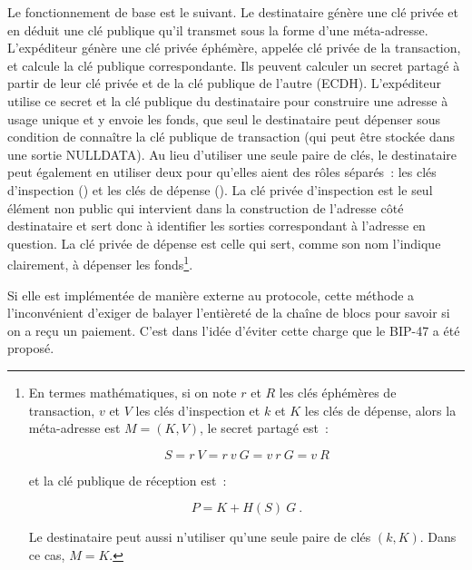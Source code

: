 Le fonctionnement de base est le suivant. Le destinataire génère une clé privée et en déduit une clé publique qu'il transmet sous la forme d'une méta-adresse. L'expéditeur génère une clé privée éphémère, appelée clé privée de la transaction, et calcule la clé publique correspondante. Ils peuvent calculer un secret partagé à partir de leur clé privée et de la clé publique de l'autre (ECDH). L'expéditeur utilise ce secret et la clé publique du destinataire pour construire une adresse à usage unique et y envoie les fonds, que seul le destinataire peut dépenser sous condition de connaître la clé publique de transaction (qui peut être stockée dans une sortie NULLDATA). Au lieu d'utiliser une seule paire de clés, le destinataire peut également en utiliser deux pour qu'elles aient des rôles séparés~: les clés d'inspection () et les clés de dépense (). La clé privée d'inspection est le seul élément non public qui intervient dans la construction de l'adresse côté destinataire et sert donc à identifier les sorties correspondant à l'adresse en question. La clé privée de dépense est celle qui sert, comme son nom l'indique clairement, à dépenser les fonds\footnote{En termes mathématiques, si on note $r$ et $R$ les clés éphémères de transaction, $v$ et $V$ les clés d'inspection et $k$ et $K$ les clés de dépense, alors la méta-adresse est $M = (K, V)$, le secret partagé est~:

\[
S = r~V = r~v~G = v~r~G = v~R
\]

et la clé publique de réception est~:

\[
P = K + H(S)~G~.
\]

Le destinataire peut aussi n'utiliser qu'une seule paire de clés $(k, K)$. Dans ce cas, $M = K$.}.

Si elle est implémentée de manière externe au protocole, cette méthode a l'inconvénient d'exiger de balayer l'entièreté de la chaîne de blocs pour savoir si on a reçu un paiement. C'est dans l'idée d'éviter cette charge que le BIP-47 a été proposé.


